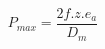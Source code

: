 \documentclass[12pt]{article}
\begin{document}
\begin{displaymath}
P_{max} = \frac {2f . z . e_a} {D_m}
\end{displaymath}
\end{document}
